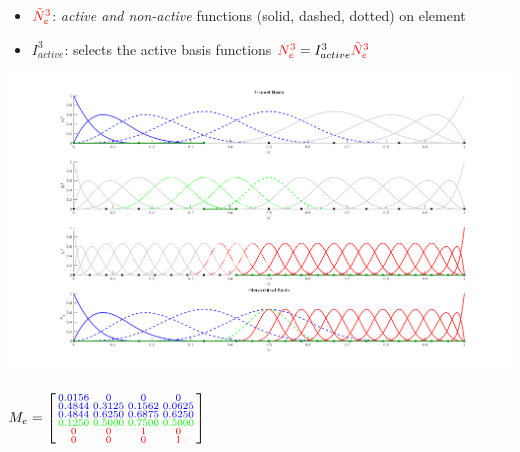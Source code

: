 \documentclass{beamer}
\begin{document}
\begin{frame}
{\begin{itemize}
		\item  $ \textcolor{red}{\tilde N^3_e} $: \emph{active and non-active} functions (solid, dashed, dotted) on element
		\item $ I^{3}_{active} $: selects the active basis functions $ \textcolor{red}{N^3_e}= I^{3}_{active}\textcolor{red}{\tilde N^3_e} $
	\end{itemize}
}
	\centering
	\begin{minipage}{0.48\textwidth}
		\centering
\includegraphics[scale=0.159]{operators1d/multiLevelBasis.png}
	\end{minipage}
	\hfill
		\begin{minipage}{0.48\textwidth}
			\centering
		\tiny	
$  M_e = \left[\begin{smallmatrix}
    \textcolor{blue}{0.0156}  &       \textcolor{blue}{0}   &      \textcolor{blue}{0}   &      \textcolor{blue}{0}\\
    \textcolor{blue}{0.4844}  &  \textcolor{blue}{0.3125}  &  \textcolor{blue}{0.1562}   & \textcolor{blue}{0.0625}\\
    \textcolor{blue}{0.4844} &   \textcolor{blue}{0.6250}   & \textcolor{blue}{0.6875}  &\textcolor{blue}{0.6250}\\
    \textcolor{green}{0.1250} &   \textcolor{green}{ 0.5000} &   \textcolor{green}{0.7500}  &   \textcolor{green}{0.5000}\\
    \textcolor{red}{0}       &  \textcolor{red}{0}   & \textcolor{red}{1}      &   \textcolor{red}{0}\\
    \textcolor{red}{0}       &  \textcolor{red}{0}   &      \textcolor{red}{0}  &  \textcolor{red}{1}\\
	\end{smallmatrix} \right]
  $
		\end{minipage}
	
	
\end{frame}
\end{document}
